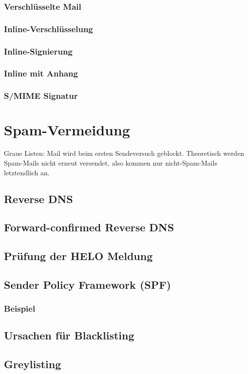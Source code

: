 \subsubsection*{Verschlüsselte Mail}
\subsubsection*{Inline-Verschlüsselung}
\subsubsection*{Inline-Signierung}
\subsubsection*{Inline mit Anhang}
\subsubsection*{S/MIME Signatur}

\section{Spam-Vermeidung}
Graue Listen: Mail wird beim ersten Sendeversuch geblockt. Theoretisch werden Spam-Mails nicht erneut versendet, also kommen nur nicht-Spam-Mails letztendlich an.

\subsection{Reverse DNS}
\subsection{Forward-confirmed Reverse DNS}
\subsection{Prüfung der HELO Meldung}
\subsection{Sender Policy Framework (SPF)}
\subsubsection{Beispiel}
\subsection{Ursachen für Blacklisting}
\subsection{Greylisting}

